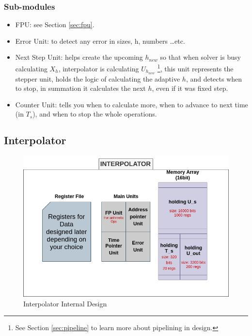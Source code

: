 \documentclass[12pt]{report}
\begin{document}
\subsubsection{Sub-modules}
\begin{itemize}
    \item {FPU}: see Section \ref{sec:fpu}.
    \item {Error Unit}: to detect any error in sizes, h, numbers \dots etc.
    \item {Next Step Unit}: helps create the upcoming $h_{new}$ so that when solver is busy calculating $X_h$, interpolator is calculating $U_{h_{new}}$ \footnote{See Section \ref{sec:pipeline} to learn more about pipelining in design.}, this unit represents the stepper unit, holds the logic of calculating the adaptive $h$, and detects when to stop, in summation it calculates the next $h$, even if it was fixed step.
    \item {Counter Unit}: tells you when to calculate more, when to advance to next time (in $T_s$), and when to stop the whole operations.
\end{itemize}

\subsection{Interpolator}

\begin{figure}[hp]
    \centering
    \includegraphics[width=\textwidth]{images/interpolator}
    \caption{Interpolator Internal Design}
    \label{fig:interpolator}
\end{figure}
\end{document}
